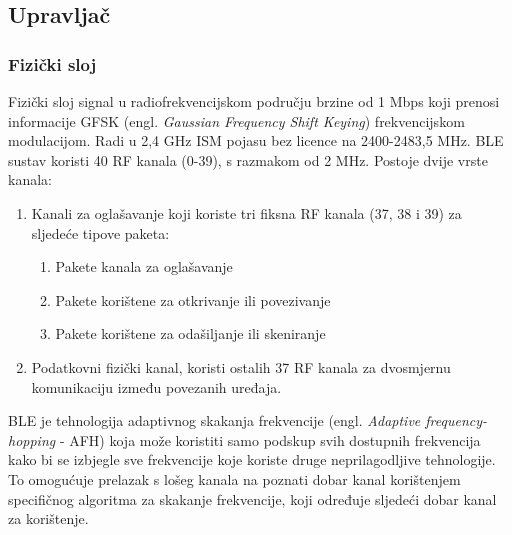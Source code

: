 \subsection{Upravljač}
\subsubsection{Fizički sloj}
Fizički sloj signal u radiofrekvencijskom području brzine od 1 Mbps koji prenosi informacije GFSK (engl. \textit{Gaussian Frequency Shift Keying}) frekvencijskom modulacijom. Radi u 2,4 GHz ISM pojasu bez licence na 2400-2483,5 MHz. 
BLE sustav koristi 40 RF kanala (0-39), s razmakom od 2 MHz. Postoje dvije vrste kanala:
\begin{enumerate}
	\item Kanali za oglašavanje koji koriste tri fiksna RF kanala (37, 38 i 39) za sljedeće tipove paketa:
	\begin{enumerate}
		\item Pakete kanala za oglašavanje
		\item Pakete korištene za otkrivanje ili povezivanje
		\item Pakete korištene za odašiljanje ili skeniranje
	\end{enumerate}
	\item Podatkovni fizički kanal, koristi ostalih 37 RF kanala za dvosmjernu komunikaciju između povezanih uređaja.
\end{enumerate}

BLE je tehnologija adaptivnog skakanja frekvencije (engl. \textit{Adaptive frequency-hopping} - AFH) koja može koristiti samo podskup svih dostupnih frekvencija kako bi se izbjegle sve frekvencije koje koriste druge neprilagodljive tehnologije. To omogućuje prelazak s lošeg kanala na poznati dobar kanal korištenjem specifičnog algoritma za skakanje frekvencije, koji određuje sljedeći dobar kanal za korištenje.

